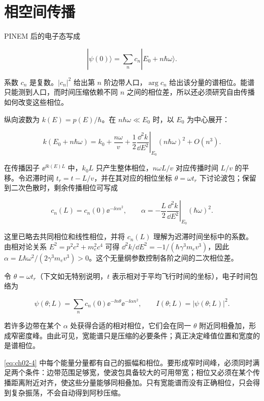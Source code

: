 \section{相空间传播}
PINEM 后的电子态写成


\begin{equation}
|\psi(0)\rangle=\sum_n c_n|E_0+n\hbar\omega\rangle.
\label{eq:ch02-1}
\end{equation}


系数 $c_n$ 是复数。$|c_n|^2$ 给出第 $n$ 阶边带人口，$\arg c_n$ 给出该分量的谱相位。能谱只能测到人口，而时间压缩依赖不同 $n$ 之间的相位差，所以还必须研究自由传播如何改变这些相位。

纵向波数为 $k(E)=p(E)/\hbar$。在 $n\hbar\omega\ll E_0$ 时，以 $E_0$ 为中心展开：


\begin{equation}
k(E_0+n\hbar\omega)=k_0+\frac{n\omega}{v}+\frac12\left.\frac{\dd ^2k}{\dd E^2}\right|_{E_0}(n\hbar\omega)^2+O(n^3).
\label{eq:ch02-2}
\end{equation}


在传播因子 $\ee^{\ii k(E)L}$ 中，$k_0L$ 只产生整体相位，$n\omega L/v$ 对应传播时间 $L/v$ 的平移。令迟滞时间 $t_r=t-L/v$，并在其对应的相位坐标 $\theta=\omega t_r$ 下讨论波包；保留到二次色散时，剩余传播相位可写成


\begin{equation}
c_n(L)=c_n(0)\ee^{-\ii\alpha n^2},\qquad \alpha=-\frac{L}{2}\left.\frac{\dd ^2k}{\dd E^2}\right|_{E_0}(\hbar\omega)^2.
\label{eq:ch02-3}
\end{equation}


这里已略去共同相位和线性相位，并将 $c_n(L)$ 理解为迟滞时间坐标中的系数。由相对论关系 $E^2=p^2c^2+m_e^2c^4$ 可得 $\dd ^2k/\dd E^2=-1/(\hbar\gamma^3m_ev^3)$，因此 $\alpha=L\hbar\omega^2/(2\gamma^3m_ev^3)>0$。这个无量纲参数控制各阶之间的二次相位差。

令 $\theta=\omega t_r$（下文如无特别说明，$t$ 表示相对于平均飞行时间的坐标），电子时间包络为


\begin{equation}
\psi(\theta;L)=\sum_n c_n(0)\ee^{-\ii n\theta}\ee^{-\ii\alpha n^2},\qquad I(\theta;L)=|\psi(\theta;L)|^2.
\label{eq:ch02-4}
\end{equation}


若许多边带在某个 $\alpha$ 处获得合适的相对相位，它们会在同一 $\theta$ 附近同相叠加，形成窄密度峰。由此可见，宽能谱只是压缩的必要条件；真正决定峰值位置和宽度的是谱相位。


\cref{eq:ch02-4} 中每个能量分量都有自己的振幅和相位。要形成窄时间峰，必须同时满足两个条件：边带范围足够宽，使波包具备较大的可用带宽；相位又必须在某个传播距离附近对齐，使这些分量能够同相叠加。只有宽能谱而没有正确相位，只会得到复杂振荡，不会自动得到阿秒压缩。

